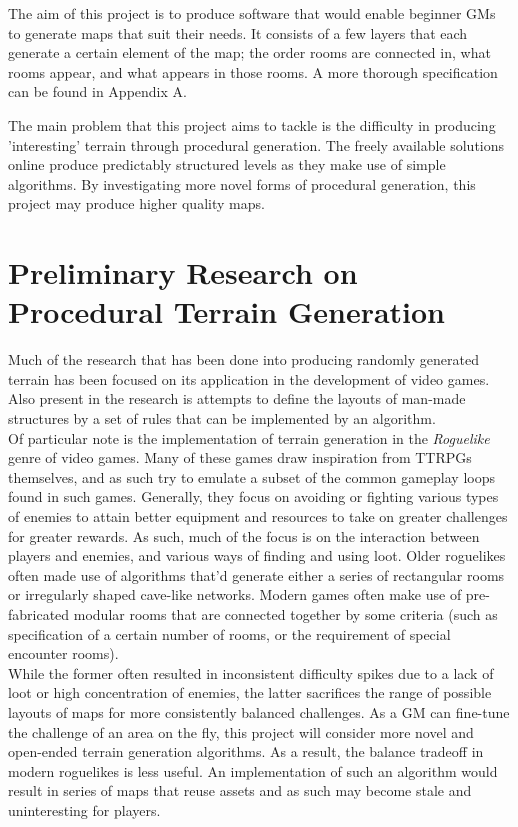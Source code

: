 \documentclass{article}
\begin{document}
The aim of this project is to produce software that would enable beginner GMs to generate maps that suit their needs. It consists of a few layers that each generate a certain element of the map; the order rooms are connected in, what rooms appear, and what appears in those rooms. A more thorough specification can be found in Appendix A.



The main problem that this project aims to tackle is the difficulty in producing 'interesting' terrain through procedural generation. The freely available solutions online produce predictably structured levels as they make use of simple algorithms. By investigating more novel forms of procedural generation, this project may produce higher quality maps. 


\section{Preliminary Research on Procedural Terrain Generation}
Much of the research that has been done into producing randomly generated terrain has been focused on its application in the development of video games. Also present in the research is attempts to define the layouts of man-made structures by a set of rules that can be implemented by an algorithm. \\

Of particular note is the implementation of terrain generation in the \textit{Roguelike} genre of video games. Many of these games draw inspiration from TTRPGs themselves, and as such try to emulate a subset of the common gameplay loops found in such games. Generally, they focus on avoiding or fighting various types of enemies to attain better equipment and resources to take on greater challenges for greater rewards. As such, much of the focus is on the interaction between players and enemies, and various ways of finding and using loot. Older roguelikes often made use of algorithms that'd generate either a series of rectangular rooms or irregularly shaped cave-like networks. Modern games often make use of pre-fabricated modular rooms that are connected together by some criteria (such as specification of a certain number of rooms, or the requirement of special encounter rooms).\\ 




While the former often resulted in inconsistent difficulty spikes due to a lack of loot or high concentration of enemies, the latter sacrifices the range of possible layouts of maps for more consistently balanced challenges. As a GM can fine-tune the challenge of an area on the fly, this project will consider more novel and open-ended terrain generation algorithms. As a result, the balance tradeoff in modern roguelikes is less useful. An implementation of such an algorithm would result in series of maps that reuse assets and as such may become stale and uninteresting for players.\\
\end{document}
